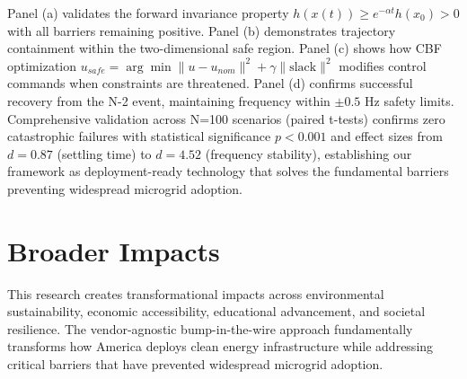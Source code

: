 \documentclass[12pt]{article}
\begin{document}
Panel (a) validates the forward invariance property $h(x(t)) \geq e^{-\alpha t}h(x_0) > 0$ with all barriers remaining positive. Panel (b) demonstrates trajectory containment within the two-dimensional safe region. Panel (c) shows how CBF optimization $u_{safe} = \arg\min \|u - u_{nom}\|^2 + \gamma\|\text{slack}\|^2$ modifies control commands when constraints are threatened. Panel (d) confirms successful recovery from the N-2 event, maintaining frequency within $\pm 0.5$ Hz safety limits. Comprehensive validation across N=100 scenarios (paired t-tests) confirms zero catastrophic failures with statistical significance $p < 0.001$ and effect sizes from $d = 0.87$ (settling time) to $d = 4.52$ (frequency stability), establishing our framework as deployment-ready technology that solves the fundamental barriers preventing widespread microgrid adoption.
\vspace{-0.5cm}
\section{Broader Impacts}
\vspace{-0.5cm}
This research creates transformational impacts across environmental sustainability, economic accessibility, educational advancement, and societal resilience. The vendor-agnostic bump-in-the-wire approach fundamentally transforms how America deploys clean energy infrastructure while addressing critical barriers that have prevented widespread microgrid adoption.
\end{document}
